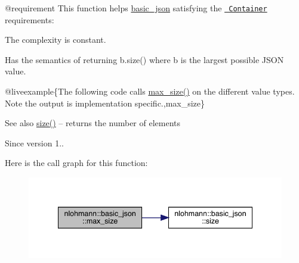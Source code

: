 @requirement This function helps {\ttfamily \mbox{\hyperlink{classnlohmann_1_1basic__json}{basic\+\_\+json}}} satisfying the \href{http://en.cppreference.com/w/cpp/concept/Container}{\texttt{ Container}} requirements\+:
\begin{DoxyItemize}
\item The complexity is constant.
\item Has the semantics of returning {\ttfamily b.\+size()} where {\ttfamily b} is the largest possible J\+S\+ON value.
\end{DoxyItemize}

@liveexample\{The following code calls {\ttfamily \mbox{\hyperlink{classnlohmann_1_1basic__json_a2f47d3c6a441c57dd2be00449fbb88e1}{max\+\_\+size()}}} on the different value types. Note the output is implementation specific.,max\+\_\+size\}

\begin{DoxySeeAlso}{See also}
\mbox{\hyperlink{classnlohmann_1_1basic__json_a25e27ad0c6d53c01871c5485e1f75b96}{size()}} -- returns the number of elements
\end{DoxySeeAlso}
\begin{DoxySince}{Since}
version 1.. 
\end{DoxySince}
Here is the call graph for this function\+:\nopagebreak
\begin{figure}[H]
\begin{center}
\leavevmode
\includegraphics[width=341pt]{classnlohmann_1_1basic__json_a2f47d3c6a441c57dd2be00449fbb88e1_cgraph}
\end{center}
\end{figure}
\mbox{\label{classnlohmann_1_1basic__json_aef6d0eeccee7c5c7e1317c2ea1607fab}} 
